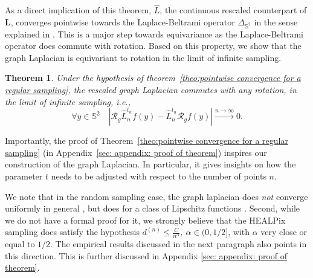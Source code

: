 \documentclass{article} %
\newtheorem{theorem}{Theorem}[section]
\renewcommand{\S}{\mathbb{S}}
\newcommand{\todo}[1]{{\color[rgb]{.6,.1,.6}{#1}}}
\newcommand{\nati}[1]{{\color[rgb]{.3,.5,.9}{#1}}}
\newcommand{\mdeff}[1]{{\color[rgb]{.8,.3,.2}{#1}}}
\newcommand{\linefrac}[2]{
    {#1/#2}
}
\begin{document}
As a direct implication of this theorem, $\hat L$, the continuous rescaled counterpart of $\mathbf{L}$, 
converges pointwise towards the Laplace-Beltrami operator $\Delta_{\S^2}$ in the sense explained in \citep{belkin2007convergence}.
This is a major step towards equivariance as the Laplace-Beltrami operator does commute with rotation. Based on this property, we show that the graph Laplacian is equivariant to rotation in the limit of infinite sampling.
\begin{theorem}\label{theo:equivariance}
Under the hypothesis of theorem~\ref{theo:pointwise convergence for a regular sampling}, the rescaled graph Laplacian commutes with any rotation, in the limit of infinite sampling, i.e.,
\begin{equation*}
	\forall y\in\mathbb S^2\quad\left| \mathcal R_g \hat L_n^{t_n} f (y) - \hat L_n^{t_n} \mathcal R_g f(y) \right| \xrightarrow{n\to\infty}0.
\end{equation*}
\end{theorem}

Importantly, the proof of Theorem~\ref{theo:pointwise convergence for a regular sampling} (in Appendix~\ref{sec: appendix: proof of theorem}) inspires our construction of the graph Laplacian.
In particular, it gives insights on how the parameter $t$ needs to be adjusted with respect to the number of points $n$.


We note that in the random sampling case, the graph laplacian does \emph{not} converge uniformly in general \citep[Sec. 3]{belkin2007convergence}, but does for a class of Lipschitz functions \citep[Sec. 6]{belkin2005towards}.
Second, while we do not have a formal proof for it, we strongly believe that the HEALPix sampling does satisfy the hypothesis $d^{(n)}\leq \frac{C}{n^\alpha}, \ \alpha\in (0,\linefrac{1}{2}]$, with $\alpha$ very close or equal to $\linefrac{1}{2}$.
The empirical results discussed in the next paragraph also points in this direction.
This is further discussed in Appendix \ref{sec: appendix: proof of theorem}.
\end{document}
